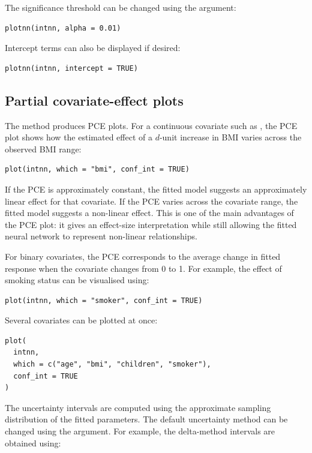The significance threshold can be changed using the  argument:

\begin{verbatim}
plotnn(intnn, alpha = 0.01)
\end{verbatim}

Intercept terms can also be displayed if desired:

\begin{verbatim}
plotnn(intnn, intercept = TRUE)
\end{verbatim}

\subsection{Partial covariate-effect plots}\label{partial-covariate-effect-plots}

The  method produces PCE plots.
For a continuous covariate such as , the PCE plot shows how the estimated effect of a \(d\)-unit increase in BMI varies across the observed BMI range:

\begin{verbatim}
plot(intnn, which = "bmi", conf_int = TRUE)
\end{verbatim}

If the PCE is approximately constant, the fitted model suggests an approximately linear effect for that covariate.
If the PCE varies across the covariate range, the fitted model suggests a non-linear effect.
This is one of the main advantages of the PCE plot: it gives an effect-size interpretation while still allowing the fitted neural network to represent non-linear relationships.

For binary covariates, the PCE corresponds to the average change in fitted response when the covariate changes from 0 to 1.
For example, the effect of smoking status can be visualised using:

\begin{verbatim}
plot(intnn, which = "smoker", conf_int = TRUE)
\end{verbatim}

Several covariates can be plotted at once:

\begin{verbatim}
plot(
  intnn,
  which = c("age", "bmi", "children", "smoker"),
  conf_int = TRUE
)
\end{verbatim}

The uncertainty intervals are computed using the approximate sampling distribution of the fitted parameters.
The default uncertainty method can be changed using the  argument.
For example, the delta-method intervals are obtained using:

